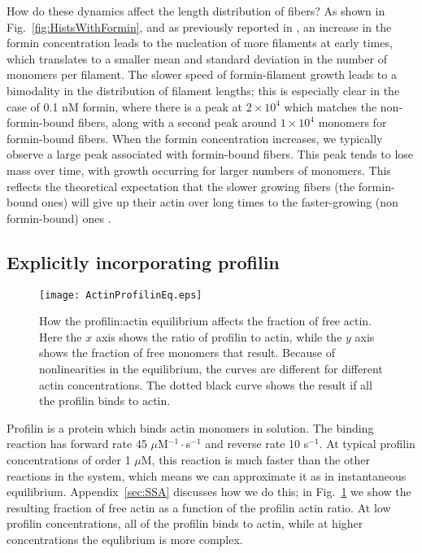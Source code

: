 \documentclass[11pt]{article}
\begin{document}
How do these dynamics affect the length distribution of fibers? As shown in Fig.\ \ref{fig:HistsWithFormin}, and as previously reported in \cite{banerjee2022emergence}, an increase in the formin concentration leads to the nucleation of more filaments at early times, which translates to a smaller mean and standard deviation in the number of monomers per filament. The slower speed of formin-filament growth leads to a bimodality in the distribution of filament lengths; this is especially clear in the case of 0.1 nM formin, where there is a peak at $2 \times 10^4$ which matches the non-formin-bound fibers, along with a second peak around $1 \times 10^4$ monomers for formin-bound fibers. When the formin concentration increases, we typically observe a large peak associated with formin-bound fibers. This peak tends to lose mass over time, with growth occurring for larger numbers of monomers. This reflects the theoretical expectation that the slower growing fibers (the formin-bound ones) will give up their actin over long times to the faster-growing (non formin-bound) ones \cite{mohapatra2017limiting}. 

\subsection{Explicitly incorporating profilin}

\begin{figure}
\centering
\texttt{[image: ActinProfilinEq.eps]}
\caption{\label{fig:ProfilinEq}How the profilin:actin equilibrium affects the fraction of free actin. Here the $x$ axis shows the ratio of profilin to actin, while the $y$ axis shows the fraction of free monomers that result. Because of nonlinearities in the equilibrium, the curves are different for different actin concentrations. The dotted black curve shows the result if all the profilin binds to actin.}
\end{figure}


Profilin is a protein which binds actin monomers in solution. The binding reaction has forward rate 45 $\mu$M$^{-1}\cdot$s$^{-1}$ and reverse rate 10 s$^{-1}$. At typical profilin concentrations of order 1 $\mu$M, this reaction is much faster than the other reactions in the system, which means we can approximate it as in instantaneous equilibrium. Appendix\ \ref{sec:SSA} discusses how we do this; in Fig.\ \ref{fig:ProfilinEq} we show the resulting fraction of free actin as a function of the profilin actin ratio. At low profilin concentrations, all of the profilin binds to actin, while at higher concentrations the equlibrium is more complex.  
\end{document}
